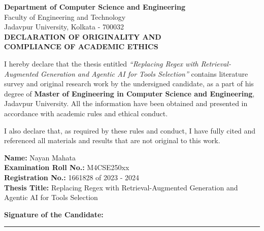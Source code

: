 
\thispagestyle{empty}

\begin{center}
    \large \textbf{Department of Computer Science and Engineering} \\
    \large Faculty of Engineering and Technology \\
    \large Jadavpur University, Kolkata - 700032 \\

    \vspace{1cm}
    \LARGE \textbf{DECLARATION OF ORIGINALITY AND} \\
    \LARGE \textbf{COMPLIANCE OF ACADEMIC ETHICS}
\end{center}

\vspace{1cm}


\noindent
I hereby declare that the thesis entitled \textit{``Replacing Regex with Retrieval-Augmented Generation and Agentic AI for Tools  Selection''} contains literature survey and original research work by the undersigned candidate, as a part of his degree of \textbf{Master of Engineering in Computer Science and Engineering}, Jadavpur University. All the information have been obtained and presented in accordance with academic rules and ethical conduct.

\vspace{0.5cm}

\noindent
I also declare that, as required by these rules and conduct, I have fully cited and referenced all materials and results that are not original to this work.

\vspace{1.5cm}

\noindent
\textbf{Name:} Nayan Mahata \\
\textbf{Examination Roll No.:} M4CSE250xx \\
\textbf{Registration No.:} 1661828 of 2023 - 2024 \\
\textbf{Thesis Title:} Replacing Regex with Retrieval-Augmented Generation and Agentic AI for Tools  Selection

\vspace{2cm}

\noindent
\textbf{Signature of the Candidate:} \rule{5cm}{0.4pt}

